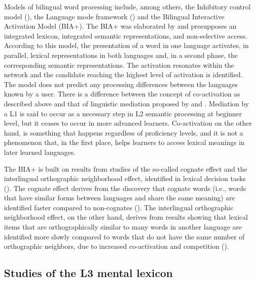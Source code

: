 \documentclass[output=paper,colorlinks,citecolor=brown,nonflat]{langsci/langscibook}
\begin{document}
Models of bilingual word processing include, among others, the Inhibitory control model (\citealt{Green1986, Green1998}), the Language mode framework (\citealt{Grosjean1997, Grosjean2001}) and the Bilingual Interactive Activation Model (BIA+). The BIA+ was elaborated by \citet{DijkstraVanHeuven2002} and presupposes an integrated lexicon, integrated semantic representations, and non-selective access. According to this model, the presentation of a word in one language activates, in parallel, lexical representations in both languages and, in a second phase, the corresponding semantic representations. The activation resonates within the network and the candidate reaching the highest level of activation is identified. The model does not predict any processing differences between the languages known by a user. There is a difference between the concept of co-activation as described above and that of linguistic mediation proposed by \citet{KrollStewart1994} and \citet{FitzpatrickIzura2011}. Mediation by a L1 is said to occur as a necessary step in L2 semantic processing at beginner level, but it ceases to occur in more advanced learners. Co-activation on the other hand, is something that happens regardless of proficiency levels, and it is not a phenomenon that, in the first place, helps learners to access lexical meanings in later learned languages.

The BIA+ is built on results from studies of the so-called cognate effect and the interlingual orthographic neighborhood effect, identified in lexical decision tasks (\citealt{SánchezCasasEtAl1992, LemhöferDijkstra2004, Dijkstra2005}). The cognate effect derives from the discovery that cognate words (i.e., words that have similar forms between languages and share the same meaning) are identified faster compared to non-cognates (\citealt{LemhöferDijkstra2004}). The interlingual orthographic neighborhood effect, on the other hand, derives from results showing that lexical items that are orthographically similar to many words in another language are identified more slowly compared to words that do not have the same number of orthographic neighbors, due to increased co-activation and competition (\citealt{GraingerDijkstra1992, VanHeuvenEtAl1998}).

\subsection{Studies of the L3 mental lexicon}\label{sec:gudmundson:1.2}
\end{document}
